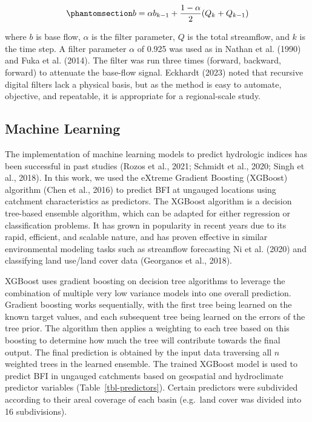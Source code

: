 \documentclass[
]{agujournal2019}
\begin{document}
\begin{equation}\phantomsection\label{eq-bf-separate}{
b = \alpha b_{k-1} + \frac{1-\alpha}{2}(Q_k + Q_{k-1})
}\end{equation}

where \(b\) is base flow, \(\alpha\) is the filter parameter, \(Q\) is
the total streamflow, and \(k\) is the time step. A filter parameter
\(\alpha\) of 0.925 was used as in Nathan et al. (1990) and Fuka et al.
(2014). The filter was run three times (forward, backward, forward) to
attenuate the base-flow signal. Eckhardt (2023) noted that recursive
digital filters lack a physical basis, but as the method is easy to
automate, objective, and repeatable, it is appropriate for a
regional-scale study.

\subsection{Machine Learning}\label{machine-learning}

The implementation of machine learning models to predict hydrologic
indices has been successful in past studies (Rozos et al., 2021; Schmidt
et al., 2020; Singh et al., 2018). In this work, we used the eXtreme
Gradient Boosting (XGBoost) algorithm (Chen et al., 2016) to predict BFI
at ungauged locations using catchment characteristics as predictors. The
XGBoost algorithm is a decision tree-based ensemble algorithm, which can
be adapted for either regression or classification problems. It has
grown in popularity in recent years due to its rapid, efficient, and
scalable nature, and has proven effective in similar environmental
modeling tasks such as streamflow forecasting Ni et al. (2020) and
classifying land use/land cover data (Georganos et al., 2018).

XGBoost uses gradient boosting on decision tree algorithms to leverage
the combination of multiple very low variance models into one overall
prediction. Gradient boosting works sequentially, with the first tree
being learned on the known target values, and each subsequent tree being
learned on the errors of the tree prior. The algorithm then applies a
weighting to each tree based on this boosting to determine how much the
tree will contribute towards the final output. The final prediction is
obtained by the input data traversing all \(n\) weighted trees in the
learned ensemble. The trained XGBoost model is used to predict BFI in
ungauged catchments based on geospatial and hydroclimate predictor
variables (Table~\ref{tbl-predictors}). Certain predictors were
subdivided according to their areal coverage of each basin (e.g.~land
cover was divided into 16 subdivisions).
\end{document}
